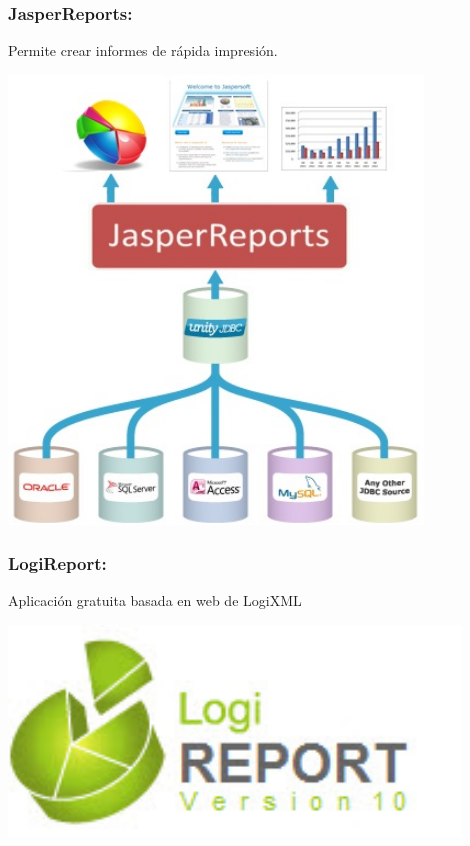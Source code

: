 \newpage	
\subsubsection{JasperReports: }\label{sec:nada2}  
Permite crear informes de rápida impresión.
	\begin{center}
	\includegraphics[width=11cm]{./Imagenes/BIimagen11}
	\end{center}
	
\subsubsection{LogiReport: }\label{sec:nada2}  
Aplicación gratuita basada en web de LogiXML
	\begin{center}
	\includegraphics[width=12cm]{./Imagenes/BIimagen12}
	\end{center}
	
\newpage
